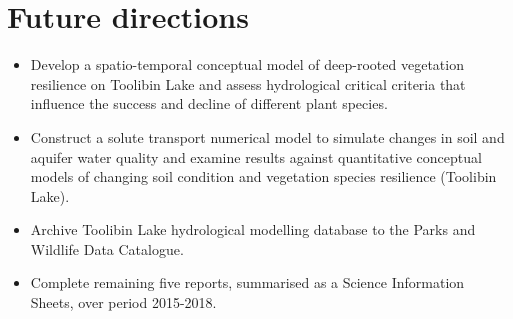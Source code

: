 \documentclass[version=last,
    paper=a4, %
    10pt, %
    usenames,
    dvipsnames,
    oneside, %
    headings=openany, %
    DIV=15 %
]{scrbook}
\begin{document}
\section*{Future directions}
\begin{itemize}
\itemsep1pt\parskip0pt
\item
  Develop a spatio-temporal conceptual model of deep-rooted vegetation
  resilience on Toolibin Lake and assess hydrological critical criteria
  that influence the success and decline of different plant species.
\item
  Construct a solute transport numerical model to simulate changes in
  soil and aquifer water quality and examine results against
  quantitative conceptual models of changing soil condition and
  vegetation species resilience (Toolibin Lake).
\item
  Archive Toolibin Lake hydrological modelling database to the Parks and
  Wildlife Data Catalogue.
\item
  Complete remaining five reports, summarised as a Science Information
  Sheets, over period 2015-2018.
\end{itemize}



\end{document}
